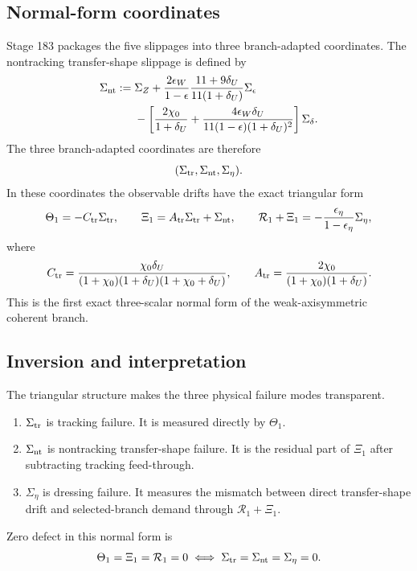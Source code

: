 \subsection{Normal-form coordinates}
Stage 183 packages the five slippages into three branch-adapted coordinates.  The nontracking transfer-shape slippage is defined by
\begin{equation}
\label{eq:part05-Sigma-nt-def}
\begin{aligned}
\Sigma_{\rm nt}:={}&
\Sigma_Z
+
\frac{2\epsilon_W}{1-\epsilon}\frac{11+9\delta_U}{11(1+\delta_U)}\Sigma_\epsilon \\
&-
\left[
\frac{2\chi_0}{1+\delta_U}
+
\frac{4\epsilon_W\delta_U}{11(1-\epsilon)(1+\delta_U)^2}
\right]\Sigma_\delta.
\end{aligned}
\end{equation}
The three branch-adapted coordinates are therefore
\begin{equation}
\label{eq:part05-normal-form-coordinates}
(\Sigma_{\rm tr},\Sigma_{\rm nt},\Sigma_\eta).
\end{equation}
In these coordinates the observable drifts have the exact triangular form
\begin{equation}
\label{eq:part05-triangular-normal-form}
\Theta_1=-C_{\rm tr}\Sigma_{\rm tr},
\qquad
\Xi_1=A_{\rm tr}\Sigma_{\rm tr}+\Sigma_{\rm nt},
\qquad
\mathcal R_1+\Xi_1=-\frac{\epsilon_\eta}{1-\epsilon_\eta}\Sigma_\eta,
\end{equation}
where
\begin{equation}
\label{eq:part05-Ctr-Atr-defs}
C_{\rm tr}
=
\frac{\chi_0\delta_U}{(1+\chi_0)(1+\delta_U)(1+\chi_0+\delta_U)},
\qquad
A_{\rm tr}
=
\frac{2\chi_0}{(1+\chi_0)(1+\delta_U)}.
\end{equation}
This is the first exact three-scalar normal form of the weak-axisymmetric coherent branch.

\subsection{Inversion and interpretation}
The triangular structure makes the three physical failure modes transparent.
\begin{enumerate}[leftmargin=2.2em]
  \item \(\Sigma_{\rm tr}\) is tracking failure.  It is measured directly by \(\Theta_1\).
  \item \(\Sigma_{\rm nt}\) is nontracking transfer-shape failure.  It is the residual part of \(\Xi_1\) after subtracting tracking feed-through.
  \item \(\Sigma_\eta\) is dressing failure.  It measures the mismatch between direct transfer-shape drift and selected-branch demand through \(\mathcal R_1+\Xi_1\).
\end{enumerate}
Zero defect in this normal form is
\begin{equation}
\label{eq:part05-zero-normal-form}
\Theta_1=\Xi_1=\mathcal R_1=0
\iff
\Sigma_{\rm tr}=\Sigma_{\rm nt}=\Sigma_\eta=0.
\end{equation}

